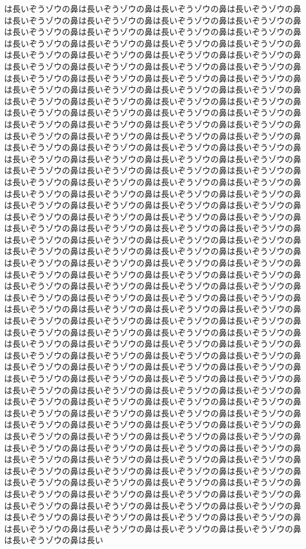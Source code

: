は長いぞうゾウの鼻は長いぞうゾウの鼻は長いぞうゾウの鼻は長いぞうゾウの鼻は長いぞうゾウの鼻は長いぞうゾウの鼻は長いぞうゾウの鼻は長いぞうゾウの鼻は長いぞうゾウの鼻は長いぞうゾウの鼻は長いぞうゾウの鼻は長いぞうゾウの鼻は長いぞうゾウの鼻は長いぞうゾウの鼻は長いぞうゾウの鼻は長いぞうゾウの鼻は長いぞうゾウの鼻は長いぞうゾウの鼻は長いぞうゾウの鼻は長いぞうゾウの鼻は長いぞうゾウの鼻は長いぞうゾウの鼻は長いぞうゾウの鼻は長いぞうゾウの鼻は長いぞうゾウの鼻は長いぞうゾウの鼻は長いぞうゾウの鼻は長いぞうゾウの鼻は長いぞうゾウの鼻は長いぞうゾウの鼻は長いぞうゾウの鼻は長いぞうゾウの鼻は長いぞうゾウの鼻は長いぞうゾウの鼻は長いぞうゾウの鼻は長いぞうゾウの鼻は長いぞうゾウの鼻は長いぞうゾウの鼻は長いぞうゾウの鼻は長いぞうゾウの鼻は長いぞうゾウの鼻は長いぞうゾウの鼻は長いぞうゾウの鼻は長いぞうゾウの鼻は長いぞうゾウの鼻は長いぞうゾウの鼻は長いぞうゾウの鼻は長いぞうゾウの鼻は長いぞうゾウの鼻は長いぞうゾウの鼻は長いぞうゾウの鼻は長いぞうゾウの鼻は長いぞうゾウの鼻は長いぞうゾウの鼻は長いぞうゾウの鼻は長いぞうゾウの鼻は長いぞうゾウの鼻は長いぞうゾウの鼻は長いぞうゾウの鼻は長いぞうゾウの鼻は長いぞうゾウの鼻は長いぞうゾウの鼻は長いぞうゾウの鼻は長いぞうゾウの鼻は長いぞうゾウの鼻は長いぞうゾウの鼻は長いぞうゾウの鼻は長いぞうゾウの鼻は長いぞうゾウの鼻は長いぞうゾウの鼻は長いぞうゾウの鼻は長いぞうゾウの鼻は長いぞうゾウの鼻は長いぞうゾウの鼻は長いぞうゾウの鼻は長いぞうゾウの鼻は長いぞうゾウの鼻は長いぞうゾウの鼻は長いぞうゾウの鼻は長いぞうゾウの鼻は長いぞうゾウの鼻は長いぞうゾウの鼻は長いぞうゾウの鼻は長いぞうゾウの鼻は長いぞうゾウの鼻は長いぞうゾウの鼻は長いぞうゾウの鼻は長いぞうゾウの鼻は長いぞうゾウの鼻は長いぞうゾウの鼻は長いぞうゾウの鼻は長いぞうゾウの鼻は長いぞうゾウの鼻は長いぞうゾウの鼻は長いぞうゾウの鼻は長いぞうゾウの鼻は長いぞうゾウの鼻は長いぞうゾウの鼻は長いぞうゾウの鼻は長いぞうゾウの鼻は長いぞうゾウの鼻は長いぞうゾウの鼻は長いぞうゾウの鼻は長いぞうゾウの鼻は長いぞうゾウの鼻は長いぞうゾウの鼻は長いぞうゾウの鼻は長いぞうゾウの鼻は長いぞうゾウの鼻は長いぞうゾウの鼻は長いぞうゾウの鼻は長いぞうゾウの鼻は長いぞうゾウの鼻は長いぞうゾウの鼻は長いぞうゾウの鼻は長いぞうゾウの鼻は長いぞうゾウの鼻は長いぞうゾウの鼻は長いぞうゾウの鼻は長いぞうゾウの鼻は長いぞうゾウの鼻は長いぞうゾウの鼻は長いぞうゾウの鼻は長いぞうゾウの鼻は長いぞうゾウの鼻は長いぞうゾウの鼻は長いぞうゾウの鼻は長いぞうゾウの鼻は長いぞうゾウの鼻は長いぞうゾウの鼻は長いぞうゾウの鼻は長いぞうゾウの鼻は長いぞうゾウの鼻は長いぞうゾウの鼻は長いぞうゾウの鼻は長いぞうゾウの鼻は長いぞうゾウの鼻は長いぞうゾウの鼻は長いぞうゾウの鼻は長いぞうゾウの鼻は長いぞうゾウの鼻は長いぞうゾウの鼻は長いぞうゾウの鼻は長いぞうゾウの鼻は長いぞうゾウの鼻は長いぞうゾウの鼻は長いぞうゾウの鼻は長いぞうゾウの鼻は長いぞうゾウの鼻は長いぞうゾウの鼻は長いぞうゾウの鼻は長いぞうゾウの鼻は長いぞうゾウの鼻は長いぞうゾウの鼻は長いぞうゾウの鼻は長いぞうゾウの鼻は長いぞうゾウの鼻は長いぞうゾウの鼻は長いぞうゾウの鼻は長いぞうゾウの鼻は長いぞうゾウの鼻は長いぞうゾウの鼻は長いぞうゾウの鼻は長いぞうゾウの鼻は長いぞうゾウの鼻は長いぞうゾウの鼻は長いぞうゾウの鼻は長いぞうゾウの鼻は長いぞうゾウの鼻は長いぞうゾウの鼻は長いぞうゾウの鼻は長いぞうゾウの鼻は長いぞうゾウの鼻は長いぞうゾウの鼻は長いぞうゾウの鼻は長いぞうゾウの鼻は長いぞうゾウの鼻は長いぞうゾウの鼻は長いぞうゾウの鼻は長いぞうゾウの鼻は長いぞうゾウの鼻は長いぞうゾウの鼻は長いぞうゾウの鼻は長いぞうゾウの鼻は長いぞうゾウの鼻は長い